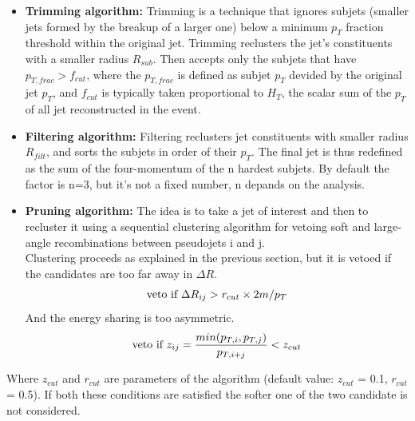 \begin{itemize}
  \item \textbf{Trimming algorithm:} Trimming is a technique that ignores subjets (smaller jets formed by the breakup of a larger one) below a minimum $p_{T}$ fraction threshold within the original jet. Trimming reclusters the jet's constituents with a smaller radius $R_{sub}$. Then accepts only the subjets that have $p_{T,frac} > f_{cut}$, where the $p_{T,frac}$ is defined as subjet $p_{T}$ devided by the original jet $p_{T}$, and $f_{cut}$ is typically taken proportional to $H_{T}$, the scalar sum of the $p_{T}$ of all jet reconstructed in the event.
  \item \textbf{Filtering algorithm:} Filtering reclusters jet constituents with smaller radius $R_{filt}$, and sorts the subjets in order of their $p_{T}$. The final jet is thus redefined as the sum of the four-momentum of the n hardest subjets. By default the factor is n=3, but it's not a fixed number, n depands on the analysis.
  \item \textbf{Pruning algorithm:} The idea is to take a jet of interest and then to recluster it using a sequential clustering algorithm for vetoing soft and large-angle recombinations between pseudojets i and j.\\ Clustering proceeds as explained in the previous section, but it is vetoed if the candidates are too far away in $\Delta R$.\\
    \begin{align}
      \textup{veto if }\Delta R_{ij} > r_{cut}\times 2m/p_{T}
    \end{align}
    And the energy sharing is too asymmetric.
    \begin{align}
      \textup{veto if } z_{ij} = \frac{min({p_{T,i},p_{T,j})}}{p_{T,i+j}} < z_{cut}
    \end{align}
\end{itemize}

Where $z_{cut}$ and $r_{cut}$ are parameters of the algorithm (default value: $z_{cut}$ = 0.1, $r_{cut}$ = 0.5). If both these conditions are satisfied the softer one of the two candidate is not considered.

